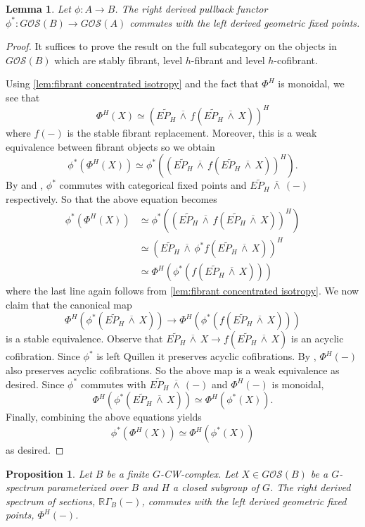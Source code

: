 \documentclass[11pt]{amsart}
\newcommand{\R}{\mathbb R}
\newcommand{\barsmash}{\,\overline\wedge\,}
\newcommand{\Osp}{\mathcal{OS}}
\theoremstyle{plain}   %
\newtheorem{lem}[thm]{Lemma}
\newtheorem{prop}[thm]{Proposition}
\theoremstyle{definition}
\theoremstyle{remark}
\numberwithin{equation}{section}
\begin{document}
\begin{lem}\label{lem:pullbacks commute with fixed points}
Let $\phi:A\to B$. The right derived pullback functor $\phi^*:G\Osp(B)\to G\Osp(A)$ commutes with the left derived geometric fixed points.
\end{lem}


\begin{proof}
It suffices to prove the result on the full subcategory on the objects in $G\Osp(B)$ which are stably fibrant, level $h$-fibrant and level $h$-cofibrant.

Using \cref{lem:fibrant concentrated isotropy} and the fact that $\Phi^H$ is monoidal, we see that
\[
\Phi^H(X)\simeq (\widetilde{EP_H}\barsmash f(\widetilde{EP_H}\barsmash X))^H
\]
where $f(-)$ is the stable fibrant replacement. Moreover, this is a weak equivalence between fibrant objects so we obtain
\[
\phi^*(\Phi^H(X)) \simeq \phi^*((\widetilde{EP_H}\barsmash f(\widetilde{EP_H}\barsmash X))^H).
\]
By \cite[Lemma 7.1.2]{malkiewich_convenient} and \cite[Proposition 4.5.1]{malkiewich_convenient}, $\phi^*$ commutes with categorical fixed points and $\widetilde{EP_H}\barsmash(-)$ respectively. So that the above equation becomes 
\begin{align*}
\phi^*(\Phi^H(X)) 
& \simeq \phi^*((\widetilde{EP_H}\barsmash f(\widetilde{EP_H}\barsmash X))^H)\\
& \simeq (\widetilde{EP_H}\barsmash \phi^*f(\widetilde{EP_H}\barsmash X))^H\\
& \simeq \Phi^H(\phi^*(f(\widetilde{EP_H}\barsmash X)))
\end{align*}
where the last line again follows from \cref{lem:fibrant concentrated isotropy}. We now claim that the canonical map 
\[
\Phi^H(\phi^*(\widetilde{EP_H}\barsmash X))\rightarrow \Phi^H(\phi^*(f(\widetilde{EP_H}\barsmash X)))
\]
is a stable equivalence. Observe that $\widetilde{EP_H}\barsmash X\to f(\widetilde{EP_H}\barsmash X)$ is an acyclic cofibration. Since $\phi^*$ is left Quillen it preserves acyclic cofibrations. By \cite{mp2}, $\Phi^H(-)$ also preserves acyclic cofibrations. So the above map is a weak equivalence as desired. Since $\phi^*$ commutes with $\widetilde{EP_H}\barsmash (-)$ and $\Phi^H(-)$ is monoidal,
\[
\Phi^H(\phi^*(\widetilde{EP_H}\barsmash X))\simeq \Phi^H(\phi^*(X)).
\]
Finally, combining the above equations yields
\[
\phi^*(\Phi^H(X)) \simeq \Phi^H(\phi^*(X))
\]
as desired. 
\end{proof}

\begin{prop}\label{prop:sections commute with geom fp}
Let $B$ be a finite $G$-CW-complex. Let $X\in G\Osp(B)$ be a $G$-spectrum parameterized over $B$ and $H$ a closed subgroup of $G$. The right derived spectrum of sections, $\R\Gamma_B(-)$, commutes with the left derived geometric fixed points, $\Phi^H(-)$. 
\end{prop}
\end{document}
